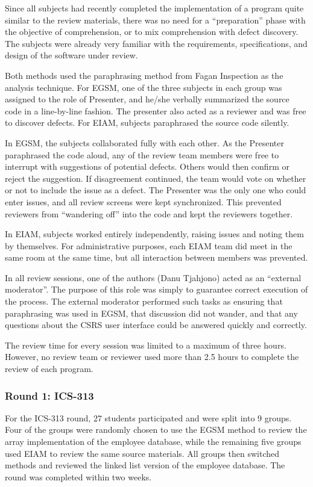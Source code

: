 Since all subjects had recently completed the implementation of a program
quite similar to the review materials, there was no need for a
``preparation'' phase with the objective of comprehension, or to mix
comprehension with defect discovery. The subjects were already very
familiar with the requirements, specifications, and design of the 
software under review.

Both methods used the paraphrasing method from Fagan Inspection as the
analysis technique.  For EGSM, one of the three subjects in each group was
assigned to the role of Presenter, and he/she verbally summarized the
source code in a line-by-line fashion.  The presenter also acted as a
reviewer and was free to discover defects. For EIAM, subjects paraphrased the
source code silently.

In EGSM, the subjects collaborated fully with each other. As the Presenter
paraphrased the code aloud, any of the review team members were free to interrupt
with suggestions of potential defects. Others would then confirm or reject
the suggestion.  If disagreement continued, the team would vote on whether
or not to include the issue as a defect.  The Presenter was the only one
who could enter issues, and all review screens were kept synchronized. This
prevented reviewers from ``wandering off'' into the code and kept the
reviewers together.

In EIAM, subjects worked entirely independently, raising issues and noting
them by themselves. For administrative purposes, each EIAM team did meet in
the same room at the same time, but all interaction between members was
prevented.

In all review sessions, one of the authors (Danu Tjahjono) acted as an
``external moderator''.  The purpose of this role was simply to guarantee
correct execution of the process. The external moderator performed such
tasks as ensuring that paraphrasing was used in EGSM, that discussion did
not wander, and that any questions about the CSRS user interface could be
answered quickly and correctly. 

The review time for every session was limited to a maximum of three hours. 
However, no review team or reviewer used more than 2.5 hours to complete
the review of each program. 

\subsubsection{Round 1: ICS-313}

For the ICS-313 round, 27 students participated and were split into 9
groups. Four of the groups were randomly chosen to use the EGSM method to
review the array implementation of the employee database, while the remaining
five groups used EIAM to review the same source materials.  All groups then
switched methods and reviewed the linked list version of the employee
database. The round was completed within two weeks. 

